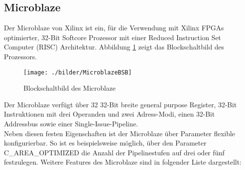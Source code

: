 \subsection{Microblaze}
Der Microblaze von Xilinx ist ein, für die Verwendung mit Xilinx FPGAs optimierter, 32-Bit Softcore Prozessor mit einer Reduced Instruction Set Computer (RISC) Architektur. Abbildung \ref{fig:MicroblazeBSB} zeigt das Blockschaltbild des Prozessors.\\
\begin{figure}[h!]
\centering
\texttt{[image: ./bilder/MicroblazeBSB]}
\caption{Blockschaltbild des Microblaze \cite{MBREF}}
\label{fig:MicroblazeBSB}
\end{figure}
\noindent
Der Microblaze verfügt über 32 32-Bit breite general purpose Register, 32-Bit Instruktionen mit drei Operanden und zwei Adress-Modi, einen
32-Bit Addressbus sowie einer Single-Issue-Pipeline.\\
Neben diesen festen Eigenschaften ist der Microblaze über Parameter flexible konfigurierbar. So ist es beispielsweise möglich, über den Parameter C\_AREA\_OPTIMIZED die Anzahl der Pipelinestufen auf drei oder fünf festzulegen. Weitere Features des Microblaze sind in folgender Liste dargestellt:\\
